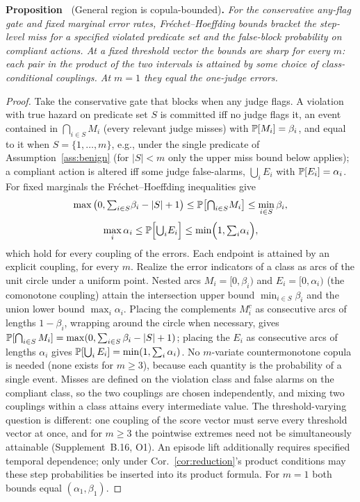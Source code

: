 \medskip
\noindent{}\textbf{Proposition~\theproposition} (General region is copula-bounded)\textbf{.}
\emph{For the conservative any-flag gate and fixed marginal error rates,
Fr\'echet--Hoeffding bounds bracket the step-level miss for a specified violated
predicate set and the false-block probability on compliant actions. At a fixed
threshold vector the bounds are sharp for every $m$: each pair in the product of the
two intervals is attained by some choice of class-conditional couplings. At $m=1$
they equal the one-judge errors.}

\begin{proof}
Take the conservative gate that blocks when any judge flags. A violation with true
hazard on predicate set $S$ is committed iff no judge flags it, an event contained in
$\bigcap_{i\in S}M_i$ (every relevant judge misses) with $\mathbb{P}[M_i]=\beta_i$, and equal
to it when $S=\{1,\ldots,m\}$, e.g., under the single predicate of
Assumption~\ref{ass:benign} (for $|S|<m$ only the upper miss bound below applies); a compliant action is altered iff
some judge false-alarms, $\bigcup_i E_i$ with $\mathbb{P}[E_i]=\alpha_i$. For fixed
marginals the Fr\'echet--Hoeffding inequalities give
\[
  \max\big(0,{\textstyle\sum_{i\in S}}\beta_i-|S|+1\big)
   \le\mathbb{P}\big[{\textstyle\bigcap_{i\in S}}M_i\big]\le\min_{i\in S}\beta_i,
\]
\[
  \max_i\alpha_i\le\mathbb{P}\Big[{\textstyle\bigcup_i}E_i\Big]
   \le\min\!\Big(1,{\textstyle\sum_i}\alpha_i\Big),
\]
which hold for every coupling of the errors. Each endpoint is attained by an
explicit coupling, for every $m$. Realize the error indicators of a class as arcs
of the unit circle under a uniform point. Nested arcs $M_i=[0,\beta_i)$ and
$E_i=[0,\alpha_i)$ (the comonotone coupling) attain the intersection upper bound
$\min_{i\in S}\beta_i$ and the union lower bound $\max_i\alpha_i$. Placing the
complements $M_i^{c}$ as consecutive arcs of lengths $1-\beta_i$, wrapping around the
circle when necessary, gives
$\mathbb{P}[\bigcap_{i\in S}M_i]=\max(0,\sum_{i\in S}\beta_i-|S|+1)$; placing the $E_i$
as consecutive arcs of lengths $\alpha_i$ gives
$\mathbb{P}[\bigcup_iE_i]=\min(1,\sum_i\alpha_i)$. No $m$-variate countermonotone
copula is needed (none exists for $m\ge3$), because each quantity is the
probability of a single event. Misses are defined on the violation class and false
alarms on the compliant class, so the two couplings are chosen independently, and
mixing two couplings within a class attains every intermediate value. The
threshold-varying question is different: one coupling of the score vector must serve
every threshold vector at once, and for $m\ge3$ the pointwise extremes need not be
simultaneously attainable (Supplement~B.16, O1). An episode lift additionally
requires specified temporal dependence; only under Cor.~\ref{cor:reduction}'s
product conditions may these step probabilities be inserted into its product
formula. For $m=1$ both bounds equal $(\alpha_1,\beta_1)$.
\end{proof}

